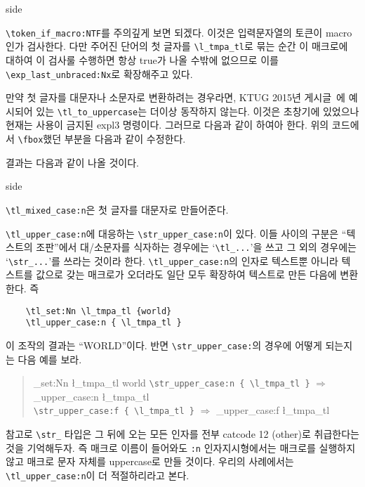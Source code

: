 \documentclass[a4paper]{oblivoir}
\begin{document}
\begin{mylistingtext}{side}
     \\
\end{mylistingtext}

\verb|\token_if_macro:NTF|를 주의깊게 보면 되겠다. 이것은 입력문자열의 토큰이 macro인가 검사한다.
다만 주어진 단어의 첫 글자를 \verb|\l_tmpa_tl|로 묶는 순간 이 매크로에 대하여 이 검사룰 수행하면 항상 true가 나올 수밖에 
없으므로 이를 \verb|\exp_last_unbraced:Nx|로 확장해주고 있다. 

\bigskip

만약 첫 글자를 대문자나 소문자로 변환하려는 경우라면, KTUG 2015년 게시글~\cite{ktug2015}에 예시되어 있는 \verb|\tl_to_uppercase|는 더이상 동작하지 않는다.
이것은 초창기에 있었으나 현재는 사용이 금지된 expl3 명령이다. 그러므로 다음과 같이 하여아 한다. 위의 코드에서 \verb|\fbox|했던 부분을 
다음과 같이 수정한다.


결과는 다음과 같이 나올 것이다.

\begin{mylistingtext}{side}
\end{mylistingtext}

\verb|\tl_mixed_case:n|은 첫 글자를 대문자로 만들어준다.

\verb|\tl_upper_case:n|에 대응하는 \verb|\str_upper_case:n|이 있다. 이들 사이의 구분은 
``텍스트의 조판''에서 대/소문자를 식자하는 경우에는 `\verb|\tl_...|'을 쓰고 그 외의 경우에는 `\verb|\str_...|'를
쓰라는 것이라 한다. \verb|\tl_upper_case:n|의 인자로 텍스트뿐 아니라 텍스트를 값으로 갖는 매크로가 오더라도 
일단 모두 확장하여 텍스트로 만든 다음에 변환한다. 즉 
\begin{verbatim}
    \tl_set:Nn \l_tmpa_tl {world}
    \tl_upper_case:n { \l_tmpa_tl }
\end{verbatim}
이 조작의 결과는 ``WORLD''이다. 반면 \verb|\str_upper_case:|의 경우에 어떻게 되는지는 다음 예를 보라.
\begin{quote}
    \ExplSyntaxOn
    \tl_set:Nn \l_tmpa_tl { world }
    \verb|\str_upper_case:n { \l_tmpa_tl }| $\Longrightarrow$ \str_upper_case:n { \l_tmpa_tl } \\
    \verb|\str_upper_case:f { \l_tmpa_tl }| $\Longrightarrow$ \str_upper_case:f { \l_tmpa_tl }
    \ExplSyntaxOff
\end{quote}
참고로 \verb|\str_| 타입은 그 뒤에 오는 모든 
인자를 전부 catcode 12 (other)로 취급한다는 것을 기억해두자. 즉 매크로 이름이 들어와도 \verb|:n| 인자지시형에서는
매크로를 실행하지 않고 매크로 문자 자체를 uppercase로 만들 것이다. 
우리의 사례에서는 \verb|\tl_upper_case:n|이 더 적절하리라고 본다. 
\end{document}
